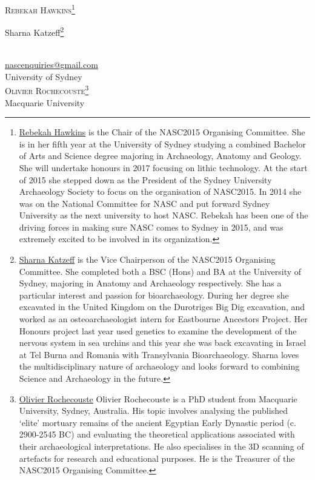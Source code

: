 \openingarticle
\def\ppages{\pagerange{NASC:firstpage}{NASC:lastpage}}
\def\shorttitle{Conference Review: National Archaeology Student Conference Australia}
\def\maintitle{National Archaeology Student Conference Australia 2015}
\def\shortauthor{Rebekah Hawkins, Sharna Katzeff, Olivier Rochecouste}
\def\authormail{}
\mychapter{\maintitle}
\begin{center}
	{\Large\scshape Rebekah Hawkins\footnote{\href{https://sydney.academia.edu/RebekahHawkins}{Rebekah Hawkins} is the Chair of the NASC2015 Organising Committee. She is in her fifth year at the University of Sydney studying a combined Bachelor of Arts and Science degree majoring in Archaeology, Anatomy and Geology. She will undertake honours in 2017 focusing on lithic technology.  At the start of 2015 she stepped down as the President of the Sydney University Archaeology Society to focus on the organisation of NASC2015. In 2014 she was on the National Committee for NASC and put forward Sydney University as the next university to host NASC. Rebekah has been one of the driving forces in making sure NASC comes to Sydney in 2015, and was extremely excited to be involved in its organization.}
	
	Sharna Katzeff\footnote{\href{https://sydney.academia.edu/sharnakatzeff}{Sharna Katzeff} is the Vice Chairperson of the NASC2015 Organising Committee. She completed both a BSC (Hons) and BA at the University of Sydney, majoring in Anatomy and Archaeology respectively. She has a particular interest and passion for bioarchaeology.  During her degree she excavated in the United Kingdom on the Durotriges Big Dig excavation, and worked as an osteoarchaeologist intern for Eastbourne Ancestors Project. Her Honours project last year used genetics to examine the development of the nervous system in sea urchins and this year she was back excavating in Israel at Tel Burna and Romania with Transylvania Bioarchaeology. Sharna loves the multidisciplinary nature of archaeology and looks forward to combining Science and Archaeology in the future.}}\\[1em]
	\href{mailto:nascenquiries@gmail.com}{nascenquiries@gmail.com} \\
	University of Sydney \\[2em]
	
	{\Large\scshape Olivier Rochecouste\footnote{\href{https://mq.academia.edu/OlivierRochecouste}{Olivier Rochecouste} Olivier Rochecouste is a PhD student from Macquarie University, Sydney, Australia. His topic involves analysing the published ‘elite’ mortuary remains of the ancient Egyptian Early Dynastic period (c. 2900-2545 BC) and evaluating the theoretical applications associated with their archaeological interpretations. He also specialises in the 3D scanning of artefacts for research and educational purposes. He is the Treasurer of the NASC2015 Organising Committee.}}\\[1em]
	Macquarie University
\end{center}
\vspace{3em}
\midarticle
	\label{NASC:firstpage}

